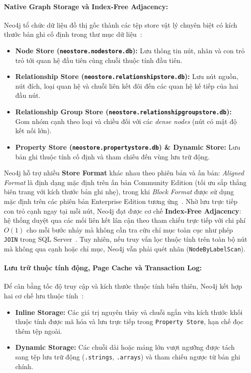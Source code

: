 \paragraph{Native Graph Storage và Index-Free Adjacency:}
Neo4j tổ chức dữ liệu đồ thị gốc thành các tệp store vật lý chuyên biệt có kích thước bản ghi cố định trong thư mục dữ liệu~\cite{t1_neo4jops}:
\begin{itemize}
  \item \textbf{Node Store (\texttt{neostore.nodestore.db}):} Lưu thông tin nút, nhãn và con trỏ trỏ tới quan hệ đầu tiên cùng chuỗi thuộc tính đầu tiên.
  \item \textbf{Relationship Store (\texttt{neostore.relationshipstore.db}):} Lưu nút nguồn, nút đích, loại quan hệ và chuỗi liên kết đôi đến các quan hệ kế tiếp của hai đầu nút.
  \item \textbf{Relationship Group Store (\texttt{neostore.\allowbreak relationshipgroupstore.db}):} Gom nhóm cạnh theo loại và chiều đối với các \textit{dense nodes} (nút có mật độ kết nối lớn).
  \item \textbf{Property Store (\texttt{neostore.propertystore.db}) \& Dynamic Store:} Lưu bản ghi thuộc tính cố định và tham chiếu đến vùng lưu trữ động.
\end{itemize}

Neo4j hỗ trợ nhiều \textbf{Store Format} khác nhau theo phiên bản và ấn bản: \textit{Aligned Format} là định dạng mặc định trên ấn bản Community Edition (tối ưu sắp thẳng biên trang với kích thước bản ghi nhẹ), trong khi \textit{Block Format} được sử dụng mặc định trên các phiên bản Enterprise Edition tương ứng~\cite{t1_neo4jops}. Nhờ lưu trực tiếp con trỏ cạnh ngay tại mỗi nút, Neo4j đạt được cơ chế \textbf{Index-Free Adjacency}: hệ thống duyệt qua các mối liên kết lân cận theo tham chiếu trực tiếp với chi phí $O(1)$ cho mỗi bước nhảy mà không cần tra cứu chỉ mục toàn cục như phép \texttt{JOIN} trong SQL Server~\cite{t1_robinson2015}. Tuy nhiên, nếu truy vấn lọc thuộc tính trên toàn bộ nút mà không qua cạnh hoặc chỉ mục, Neo4j vẫn phải quét nhãn (\texttt{NodeByLabelScan}).

\paragraph{Lưu trữ thuộc tính động, Page Cache và Transaction Log:}
Để cân bằng tốc độ truy cập và kích thước thuộc tính biến thiên, Neo4j kết hợp hai cơ chế lưu thuộc tính~\cite{t1_neo4jops}:
\begin{itemize}
  \item \textbf{Inline Storage:} Các giá trị nguyên thủy và chuỗi ngắn vừa kích thước khối thuộc tính được mã hóa và lưu trực tiếp trong \texttt{Property Store}, hạn chế đọc thêm tệp ngoài.
  \item \textbf{Dynamic Storage:} Các chuỗi dài hoặc mảng lớn vượt ngưỡng được tách sang tệp lưu trữ động (\texttt{.strings}, \texttt{.arrays}) và tham chiếu ngược từ bản ghi chính.
\end{itemize}

